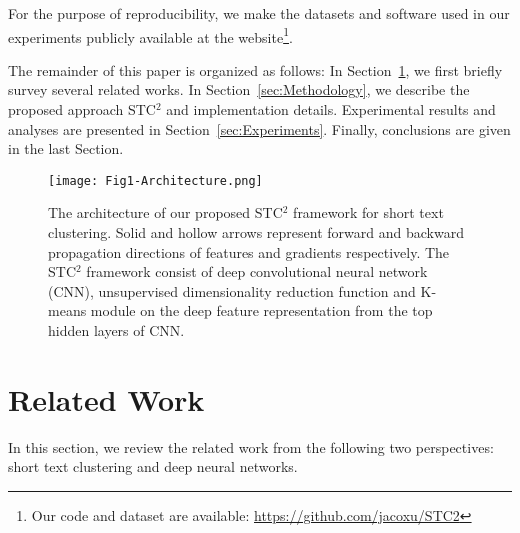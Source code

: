\documentclass[review]{elsarticle}
\begin{document}
For the purpose of reproducibility, we make the datasets and software used in our experiments publicly available at the website\footnote{Our code and dataset are available: \url{https://github.com/jacoxu/STC2}}.

The remainder of this paper is organized as follows: In Section~\ref{sec:RelatedWork}, we first briefly survey several related works. In Section~\ref{sec:Methodology}, we describe the proposed approach STC$^2$ and implementation details. Experimental results and analyses are presented in Section~\ref{sec:Experiments}. Finally, conclusions are given in the last Section.

\begin{figure}[t]
\begin{center}
\texttt{[image: Fig1-Architecture.png]}
\caption{The architecture of our proposed STC$^2$ framework for short text clustering. Solid and hollow arrows represent forward and backward propagation directions of features and gradients respectively. The STC$^2$ framework consist of deep convolutional neural network (CNN), unsupervised dimensionality reduction function and K-means module on the deep feature representation from the top hidden layers of CNN.}\label{fig:Architecture}
\end{center}
\end{figure}

\section{Related Work}
\label{sec:RelatedWork}
In this section, we review the related work from the following two perspectives: short text clustering and deep neural networks.
\end{document}
